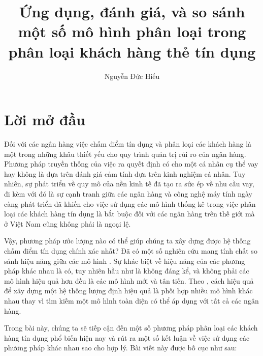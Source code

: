 \documentclass[a4paper]{report}\usepackage[]{graphicx}\usepackage[]{color}
\title{Ứng dụng, đánh giá, và so sánh một số mô hình phân loại trong phân loại khách hàng thẻ tín dụng}\let\Title\@title
\author{Nguyễn Đức Hiếu}\let\Author\@author
\begin{document}




\clearpage\tableofcontents

\listoffigures
{}

\begingroup
\let\clearpage\relax
{}
\listoftables
\endgroup




\chapter*{Lời mở đầu}

%
Đối với các ngân hàng việc chấm điểm tín dụng và phân loại các khách hàng là một trong những khâu thiết yếu cho quy trình quản trị rủi ro của ngân hàng.
%
Phương pháp truyền thống của việc ra quyết định có cho một cá nhân cụ thể vay hay không là dựa trên đánh giá cảm tính dựa trên kinh nghiệm cá nhân.
%
Tuy nhiên, sự phát triển về quy mô của nền kinh tế đã tạo ra sức ép về nhu cầu vay, đi kèm với đó là sự cạnh tranh giữa các ngân hàng và công nghệ máy tính ngày càng phát triển đã khiến cho việc sử dụng các mô hình thống kê trong việc phân loại các khách hàng tín dụng là bắt buộc đối với các ngân hàng trên thế giới mà ở Việt Nam cũng không phải là ngoại lệ.
%

Vậy, phương pháp ước lượng nào có thể giúp chúng ta xây dựng được hệ thống chấm điểm tín dụng chính xác nhất? Đã có một số nghiên cứu mang tính chất so sánh hiệu năng giữa các mô hình \parencite{baesens2003benchmarking, xiao2006comparative, lessmann2015benchmarking}. 
Sự khác biệt về hiệu năng của các phương pháp khác nhau là có, tuy nhiên hầu như là không đáng kể, và không phải các mô hình hiệu quả hơn đều là các mô hình mới và tân tiến.
Theo \textcite{thomas2010consumer}, cách hiệu quả để xây dựng một hệ thống lượng định hiệu quả là phối hợp nhiều mô hình khác nhau thay vì tìm kiếm một mô hình toàn diện có thể áp dụng với tất cả các ngân hàng.

Trong bài này, chúng ta sẽ tiếp cận đến một số phương pháp phân loại các khách hàng tín dụng phổ biến hiện nay và rút ra một số kết luận về việc sử dụng các phương pháp khác nhau sao cho hợp lý. Bài viết này được bố cục như sau:
\end{document}
